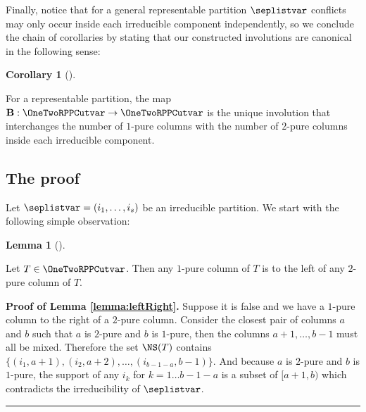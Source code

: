 \documentclass[numbers=enddot,12pt,final,onecolumn,notitlepage]{scrartcl}%
\theoremstyle{definition}
\newtheorem{lem}[theo]{Lemma}
\newenvironment{lemma}[1][]
{\begin{lem}[#1]\begin{leftbar}}
{\end{leftbar}\end{lem}}
\newtheorem{coro}[theo]{Corollary}
\newenvironment{corollary}[1][]
{\begin{coro}[#1]\begin{leftbar}}
{\end{leftbar}\end{coro}}
\newenvironment{proof}[1][Proof]{\noindent\textbf{#1.} }{\ \rule{0.5em}{0.5em}}
\begin{document}
Finally, notice that for a general representable partition $\seplistvar$ conflicts may only occur inside each irreducible component independently, so we conclude the chain of corollaries by stating that our constructed involutions are canonical in the following sense:

\begin{corollary}
 For a representable partition, the map $\mathbf{B}:\OneTwoRPPCutvar\to\OneTwoRPPCutvar$ is the unique involution that interchanges the number of $1$-pure columns with the number of $2$-pure columns inside each irreducible component.
\end{corollary}

\subsection{The proof}
Let $\seplistvar=(i_1,\dots,i_s)$ be an irreducible partition. We start with the following simple observation:
\begin{lemma}
\label{lemma:leftRight}
 Let $T\in\OneTwoRPPCutvar$. Then any $1$-pure column of $T$ is to the left of any $2$-pure column of $T$.
\end{lemma}
\begin{proof}[Proof of Lemma \ref{lemma:leftRight}]
Suppose it is false and we have a $1$-pure column to the right of a $2$-pure column. Consider the closest pair of columns $a$ and $b$ such that $a$ is $2$-pure and $b$ is $1$-pure, then the columns $a+1,\dots,b-1$ must all be mixed. %
Therefore the set $\NS(T)$ contains $\{(i_1,a+1),(i_2,a+2),\dots,(i_{b-1-a},b-1)\}$. And because $a$ is $2$-pure and $b$ is $1$-pure, the support of any $i_k$ for $k=1\dots b-1-a$ is a subset of $[a+1,b)$ which contradicts the irreducibility of $\seplistvar$.
\end{proof}
\end{document}
